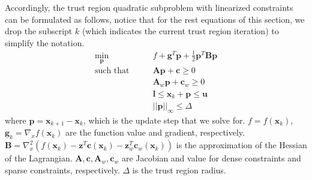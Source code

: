 \documentclass[12pt]{article}
\newcommand{\mb}{\mathbf}
\begin{document}
Accordingly, the trust region quadratic subproblem with linearized constraints can be formulated as follows, notice that for the rest equations of this section, we drop the subscript $k$ (which indicates the current trust region iteration) to simplify the notation.
%
\begin{equation}
  \label{eqn:quad-problem}
  \begin{aligned}
    \min_{\mb{p}} \qquad & f + \mb{g}^T\mb{p} + \frac{1}{2}\mb{p}^T\mb{B}\mb{p} \\
    \text{such that} \qquad
    & \mb{A}\mb{p} + \mb{c} \ge 0 \\
    & \mb{A}_{w}\mb{p} + \mb{c}_{w} \ge 0 \\
    & \mb{l} \le \mb{x}_k + \mb{p} \le \mb{u} \\
    & ||\mb{p}||_\infty \le \Delta
  \end{aligned}
\end{equation}
%
where $\mb{p} = \mb{x}_{k+1} - \mb{x}_{k}$, which is the update step that we solve for. $f = f(\mb{x}_k)$, $\mb{g}_k = \nabla_x f(\mb{x}_k)$ are the function value and gradient, respectively. $\mb{B} = \nabla_x^2 (f(\mb{x}_k) - \mb{z}^T \mb{c}(\mb{x}_k)-\mb{z}_w^T \mb{c}_w(\mb{x}_k))$ is the approximation of the Hessian of the Lagrangian. $\mb{A}, \mb{c}, \mb{A}_w, \mb{c}_w$ are Jacobian and value for dense constraints and sparse constraints, respectively. $\Delta$ is the trust region radius.
\end{document}
